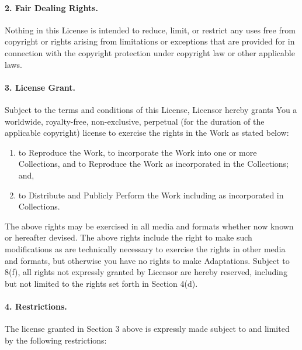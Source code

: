 \paragraph{2. Fair Dealing Rights.} Nothing in this License is intended to reduce, limit, or restrict any uses free from copyright or rights arising from limitations or exceptions that are provided for in connection with the copyright protection under copyright law or other applicable laws.

\paragraph{3. License Grant.} Subject to the terms and conditions of this License, Licensor hereby grants You a worldwide, royalty-free, non-exclusive, perpetual (for the duration of the applicable copyright) license to exercise the rights in the Work as stated below:
\begin{enumerate}
  \item to Reproduce the Work, to incorporate the Work into one or more Collections, and to Reproduce the Work as incorporated in the Collections; and,
  \item to Distribute and Publicly Perform the Work including as incorporated in Collections.
\end{enumerate}
The above rights may be exercised in all media and formats whether now known or hereafter devised. The above rights include the right to make such modifications as are technically necessary to exercise the rights in other media and formats, but otherwise you have no rights to make Adaptations. Subject to 8(f), all rights not expressly granted by Licensor are hereby reserved, including but not limited to the rights set forth in Section 4(d).

\paragraph{4. Restrictions.} The license granted in Section 3 above is expressly made subject to and limited by the following restrictions:

